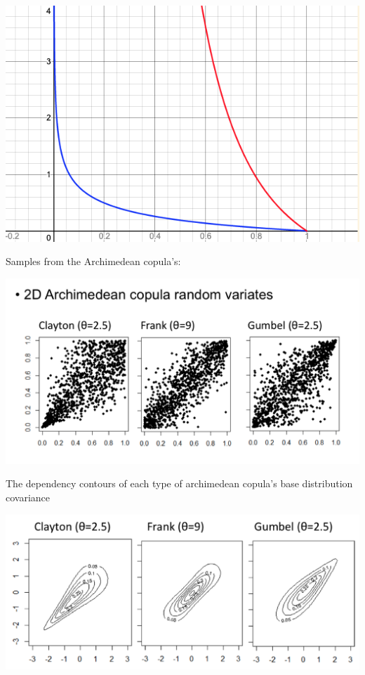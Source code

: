 \documentclass[
  oneside]{book}
\begin{document}
\includegraphics{Notes/Obsidian-Attachments/4-Multivariate-Return-Modelling-12.png}

Samples from the Archimedean copula's:

\includegraphics{Notes/Obsidian-Attachments/4-Multivariate-Return-Modelling-11.png}

The dependency contours of each type of archimedean copula's base distribution covariance

\includegraphics{Notes/Obsidian-Attachments/4-Multivariate-Return-Modelling-13.png}
\end{document}
